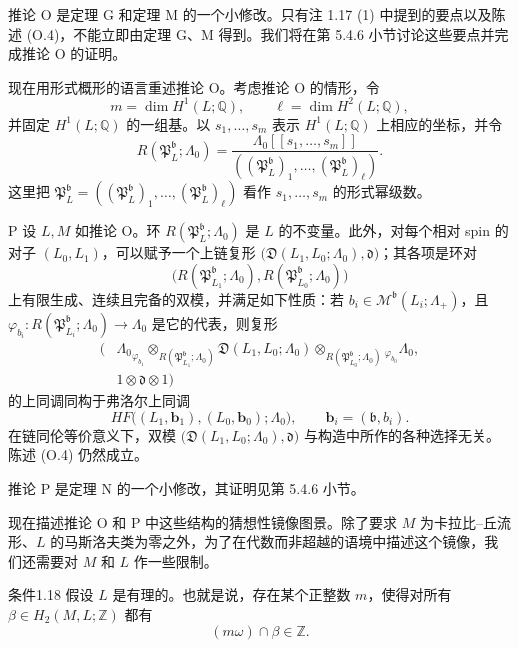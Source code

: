 推论 O 是定理 G 和定理 M 的一个小修改。只有注 1.17 (1) 中提到的要点以及陈述 (O.4)，不能立即由定理 G、M 得到。我们将在第 5.4.6 小节讨论这些要点并完成推论 O 的证明。

现在用形式概形的语言重述推论 O。考虑推论 O 的情形，令
\[
  m=\dim H^1(L;\mathbb Q),
  \qquad
  \ell=\dim H^2(L;\mathbb Q),
\]
并固定 $H^1(L;\mathbb Q)$ 的一组基。以 $s_1,\ldots,s_m$ 表示 $H^1(L;\mathbb Q)$ 上相应的坐标，并令
\[
  R(\mathfrak P^{\mathfrak b}_L;\Lambda_0)
  =\frac{\Lambda_0[[s_1,\ldots,s_m]]}
  {((\mathfrak P^{\mathfrak b}_L)_1,\ldots,
    (\mathfrak P^{\mathfrak b}_L)_\ell)}.
\]
这里把
$\mathfrak P^{\mathfrak b}_L=((\mathfrak P^{\mathfrak b}_L)_1,\ldots,
(\mathfrak P^{\mathfrak b}_L)_\ell)$
看作 $s_1,\ldots,s_m$ 的形式幂级数。

\begin{corollary}{P}\label{cor:intro-P}
设 $L,M$ 如推论 O。环 $R(\mathfrak P^{\mathfrak b}_L;\Lambda_0)$ 是 $L$ 的不变量。此外，对每个相对 spin 的对子 $(L_0,L_1)$，可以赋予一个上链复形
$\bigl(\mathfrak D(L_1,L_0;\Lambda_0),\mathfrak d\bigr)$；其各项是环对
\[
  \bigl(R(\mathfrak P^{\mathfrak b}_{L_1};\Lambda_0),
    R(\mathfrak P^{\mathfrak b}_{L_0};\Lambda_0)\bigr)
\]
上有限生成、连续且完备的双模，并满足如下性质：若
$b_i\in\mathcal M^{\mathfrak b}(L_i;\Lambda_+)$，且
$\varphi_{b_i}:R(\mathfrak P^{\mathfrak b}_{L_i};\Lambda_0)\to\Lambda_0$
是它的代表，则复形
\[
\begin{split}
\bigl(&{\Lambda_0}_{\varphi_{b_1}}
 \otimes_{R(\mathfrak P^{\mathfrak b}_{L_1};\Lambda_0)}
 \mathfrak D(L_1,L_0;\Lambda_0)
 \otimes_{R(\mathfrak P^{\mathfrak b}_{L_0};\Lambda_0)}
 {_{\varphi_{b_0}}\Lambda_0},\\
 &1\otimes\mathfrak d\otimes1\bigr)
\end{split}
\]
的上同调同构于弗洛尔上同调
\[
  HF\bigl((L_1,\mathbf b_1),(L_0,\mathbf b_0);\Lambda_0\bigr),
  \qquad \mathbf b_i=(\mathfrak b,b_i).
\]
在链同伦等价意义下，双模
$\bigl(\mathfrak D(L_1,L_0;\Lambda_0),\mathfrak d\bigr)$
与构造中所作的各种选择无关。陈述 (O.4) 仍然成立。
\end{corollary}

推论 P 是定理 N 的一个小修改，其证明见第 5.4.6 小节。

现在描述推论 O 和 P 中这些结构的猜想性镜像图景。除了要求 $M$ 为卡拉比--丘流形、$L$ 的马斯洛夫类为零之外，为了在代数而非超越的语境中描述这个镜像，我们还需要对 $M$ 和 $L$ 作一些限制。

\begin{statement}{条件}{1.18}\label{cond:1-18}
假设 $L$ 是有理的。也就是说，存在某个正整数 $m$，使得对所有
$\beta\in H_2(M,L;\mathbb Z)$ 都有
\[
  (m\omega)\cap\beta\in\mathbb Z.
\]
\end{statement}

